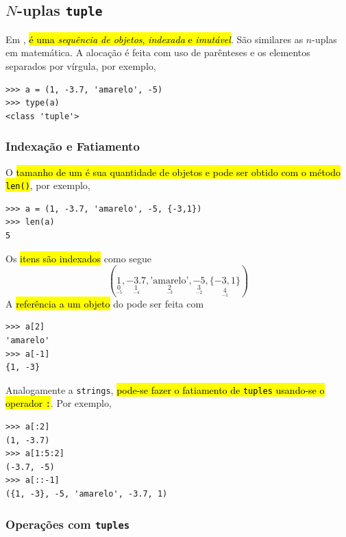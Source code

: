 \subsection{$N$-uplas \texttt{tuple}}

Em \python, \hl{{\PYTHONtuple} é uma \emph{sequência de objetos}, \emph{indexada} e \emph{imutável}}. São similares as $n$-uplas em matemática. A alocação é feita com uso de parênteses e os elementos separados por vírgula, por exemplo,

\begin{lstlisting}
>>> a = (1, -3.7, 'amarelo', -5)
>>> type(a)
<class 'tuple'>
\end{lstlisting}

\subsubsection{Indexação e Fatiamento}

O \hl{tamanho de um {\PYTHONtuple} é sua quantidade de objetos e pode ser obtido com o método \texttt{len()}}, por exemplo,

\begin{lstlisting}
>>> a = (1, -3.7, 'amarelo', -5, {-3,1})
>>> len(a)
5
\end{lstlisting}

Os \hl{itens são indexados} como segue
\begin{equation}
  (\underset{\underset{-5}{0}}{1}, \underset{\underset{-4}{1}}{-3.7}, \underset{\underset{-3}{2}}{\text{'amarelo'}}, \underset{\underset{-2}{3}}{-5}, \underset{\underset{-1}{4}}{\{-3, 1\}})
\end{equation}
A \hl{referência a um objeto} do {\PYTHONtuple} pode ser feita com

\begin{lstlisting}
>>> a[2]
'amarelo'
>>> a[-1]
{1, -3}
\end{lstlisting}

Analogamente a \texttt{strings}, \hl{pode-se fazer o fatiamento de \texttt{tuples} usando-se o operador \texttt{:}}. Por exemplo,

\begin{lstlisting}
>>> a[:2]
(1, -3.7)
>>> a[1:5:2]
(-3.7, -5)
>>> a[::-1]
({1, -3}, -5, 'amarelo', -3.7, 1)
\end{lstlisting}

\subsubsection{Operações com \texttt{tuples}}

